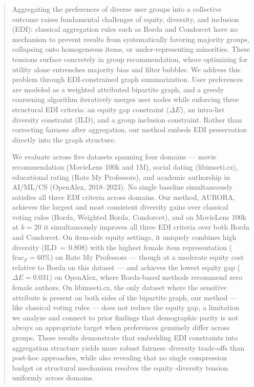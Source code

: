 \documentclass[runningheads]{llncs}
\begin{document}
%
\maketitle              %
%
\begin{abstract}
Aggregating the preferences of diverse user groups into a collective outcome
raises fundamental challenges of equity, diversity, and inclusion (EDI):
classical aggregation rules such as Borda and Condorcet have no mechanism
to prevent results from systematically favoring majority groups, collapsing
onto homogeneous items, or under-representing minorities. These tensions
surface concretely in group recommendation, where optimizing for utility
alone entrenches majority bias and filter bubbles. We address this problem
through EDI-constrained graph summarization. User preferences are modeled
as a weighted attributed bipartite graph, and a greedy coarsening algorithm
iteratively merges user nodes while enforcing three structural EDI criteria:
an equity gap constraint ($\Delta E$), an intra-list diversity constraint
(ILD), and a group inclusion constraint. Rather than correcting fairness
after aggregation, our method embeds EDI preservation directly into the
graph structure.

We evaluate across five datasets spanning four domains --- movie
recommendation (MovieLens 100k and 1M), social dating (libimseti.cz),
educational rating (Rate My Professors), and academic authorship in
AI/ML/CS (OpenAlex, 2018--2023). No single baseline simultaneously
satisfies all three EDI criteria across domains. Our method, AURORA,
achieves the largest and most consistent diversity gains over classical
voting rules (Borda, Weighted Borda, Condorcet), and on MovieLens 100k at
$k=20$ it simultaneously improves all three EDI criteria over both Borda
and Condorcet. On item-side equity settings, it uniquely combines
high diversity (ILD\,$=$\,0.808) with the highest female item
representation ($\mathrm{frac}_F=60\%$) on Rate My Professors --- though
at a moderate equity cost relative to Borda on this dataset --- and
achieves the lowest equity gap ($\Delta E = 0.031$) on OpenAlex, where
Borda-based methods recommend zero female authors. On libimseti.cz, the
only dataset where the sensitive attribute is present on both sides of the
bipartite graph, our method --- like classical voting rules --- does not
reduce the equity gap, a limitation we
analyze and connect to prior findings that demographic parity is not
always an appropriate target when preferences genuinely differ across
groups. These results demonstrate that embedding EDI constraints into
aggregation structure yields more robust fairness--diversity trade-offs
than post-hoc approaches, while also revealing that no single
compression budget or structural mechanism resolves the equity--diversity
tension uniformly across domains.
\end{abstract}
%
%
%
\end{document}
